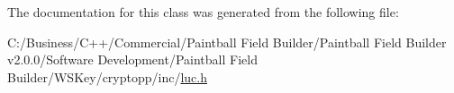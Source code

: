 The documentation for this class was generated from the following file:\begin{DoxyCompactItemize}
\item 
C:/Business/C++/Commercial/Paintball Field Builder/Paintball Field Builder v2.0.0/Software Development/Paintball Field Builder/WSKey/cryptopp/inc/\hyperlink{luc_8h}{luc.h}\end{DoxyCompactItemize}
